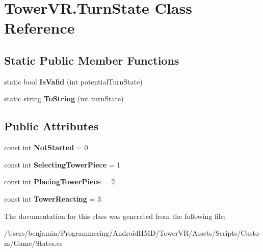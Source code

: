 \hypertarget{class_tower_v_r_1_1_turn_state}{}\section{Tower\+V\+R.\+Turn\+State Class Reference}
\label{class_tower_v_r_1_1_turn_state}
\subsection*{Static Public Member Functions}
\begin{DoxyCompactItemize}
\item 
static bool {\bfseries Is\+Valid} (int potential\+Turn\+State)\hypertarget{class_tower_v_r_1_1_turn_state_a203c3369f5ef29df16e72a4ee8427f58}{}\label{class_tower_v_r_1_1_turn_state_a203c3369f5ef29df16e72a4ee8427f58}

\item 
static string {\bfseries To\+String} (int turn\+State)\hypertarget{class_tower_v_r_1_1_turn_state_a0d8995c30ef7e1af0d2dda5c4bb8150e}{}\label{class_tower_v_r_1_1_turn_state_a0d8995c30ef7e1af0d2dda5c4bb8150e}

\end{DoxyCompactItemize}
\subsection*{Public Attributes}
\begin{DoxyCompactItemize}
\item 
const int {\bfseries Not\+Started} = 0\hypertarget{class_tower_v_r_1_1_turn_state_a8df0d8eddb9324e7a9006ac62751a73c}{}\label{class_tower_v_r_1_1_turn_state_a8df0d8eddb9324e7a9006ac62751a73c}

\item 
const int {\bfseries Selecting\+Tower\+Piece} = 1\hypertarget{class_tower_v_r_1_1_turn_state_a131a4d02f0c537275e453d1c6aa5c535}{}\label{class_tower_v_r_1_1_turn_state_a131a4d02f0c537275e453d1c6aa5c535}

\item 
const int {\bfseries Placing\+Tower\+Piece} = 2\hypertarget{class_tower_v_r_1_1_turn_state_a7594dc7af385691556c9ab21d477e93f}{}\label{class_tower_v_r_1_1_turn_state_a7594dc7af385691556c9ab21d477e93f}

\item 
const int {\bfseries Tower\+Reacting} = 3\hypertarget{class_tower_v_r_1_1_turn_state_a9ac24dc02210ce472b97236e16381d4f}{}\label{class_tower_v_r_1_1_turn_state_a9ac24dc02210ce472b97236e16381d4f}

\end{DoxyCompactItemize}


The documentation for this class was generated from the following file\+:\begin{DoxyCompactItemize}
\item 
/\+Users/benjamin/\+Programmering/\+Android\+H\+M\+D/\+Tower\+V\+R/\+Assets/\+Scripts/\+Custom/\+Game/States.\+cs\end{DoxyCompactItemize}
